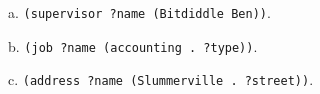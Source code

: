 \documentclass[a4paper,12pt]{article}
\newcommand{\subpar}[1]{\medskip \noindent #1.}
\begin{document}
\subpar{a} \lstinline!(supervisor ?name (Bitdiddle Ben))!.

\subpar{b} \lstinline!(job ?name (accounting . ?type))!.

\subpar{c} \lstinline!(address ?name (Slummerville . ?street))!.
\end{document}
